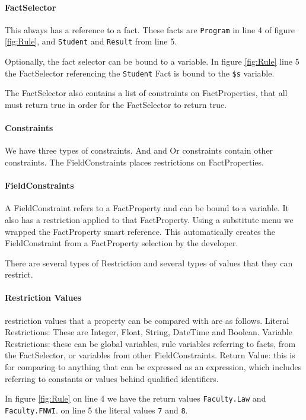 \paragraph{FactSelector} This always has a reference to a fact.
These facts are \texttt{Program} in line 4 of figure \ref{fig:Rule}, and \texttt{Student} and \texttt{Result} from line 5.

Optionally, the fact selector can be bound to a variable.
In figure \ref{fig:Rule} line 5 the FactSelector referencing the \texttt{Student} Fact is bound to the \texttt{\$s} variable.

The FactSelector also contains a list of constraints on FactProperties, that all must return true in order for the FactSelector to return true.

\paragraph{Constraints} We have three types of constraints.
And and Or constraints contain other constraints.
The FieldConstraints places restrictions on FactProperties.

\paragraph{FieldConstraints}
A FieldConstraint refers to a FactProperty and can be bound to a variable.
It also has a restriction applied to that FactProperty.
Using a substitute menu we wrapped the FactProperty smart reference.
This automatically creates the FieldConstraint from a FactProperty selection by the developer.

There are several types of Restriction and several types of values that they can restrict.

\paragraph{Restriction Values} restriction values that a property can be compared with are as follows.
Literal Restrictions: These are Integer, Float, String, DateTime and Boolean.
Variable Restrictions: these can be global variables, rule variables referring to facts, from the FactSelector, or variables from other FieldConstraints.
Return Value: this is for comparing to anything that can be expressed as an expression, which includes referring to constants or values behind qualified identifiers.

In figure \ref{fig:Rule} on line 4 we have the return values \texttt{Faculty.Law} and \texttt{Faculty.FNWI}.
on line 5 the literal values \texttt{7} and \texttt{8}.

